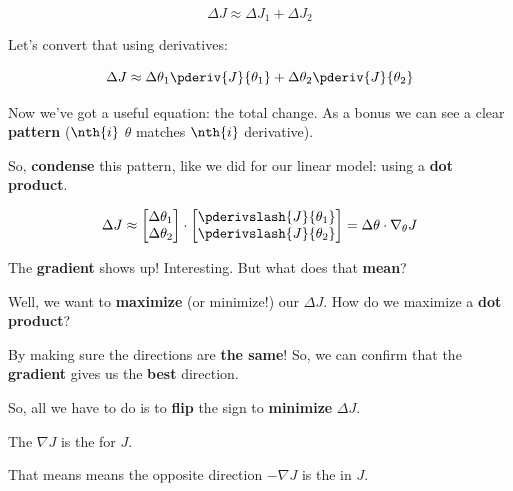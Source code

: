         \begin{equation}
            \Delta J \approx \Delta J_1 + \Delta J_2
        \end{equation}
        
        Let's convert that using derivatives:
        
        \begin{equation}
            \Delta J \approx
            \Delta \theta_1 \pderiv{J}{\theta_1} +
            \Delta \theta_2 \pderiv{J}{\theta_2}
        \end{equation}
        
        Now we've got a useful equation: the total change. As a bonus we can see a clear \textbf{pattern} ($\nth{i}$ $\theta$ matches $\nth{i}$ derivative). 
        
        So, \textbf{condense} this pattern, like we did for our linear model: using a \textbf{dot product}.
        
        \begin{equation}
            \Delta J 
            \approx 
            \begin{bmatrix}
              \Delta \theta_1 \\ \Delta \theta_2
            \end{bmatrix}
            \cdot
            \begin{bmatrix}
                \pderivslash{J}{ \theta_1}  \\ 
                \pderivslash{J}{ \theta_2 } 
            \end{bmatrix}
            =
            \Delta \theta \cdot \nabla_\theta J
        \end{equation}
        
        The \textbf{gradient} shows up! Interesting. But what does that \textbf{mean}?
        
        Well, we want to \textbf{maximize} (or minimize!) our $\Delta J$. How do we maximize a \textbf{dot product}?
        
        By making sure the directions are \textbf{the same}! So, we can confirm that the \textbf{gradient} gives us the \textbf{best} direction.
        
        So, all we have to do is to \textbf{flip} the sign to \textbf{minimize} $\Delta J$.
            \\
        
        \begin{concept}
            The  $\nabla J$ is the  for $J$.
            
            That means means the opposite direction $-\nabla J$ is the  in $J$.
        \end{concept}
        
